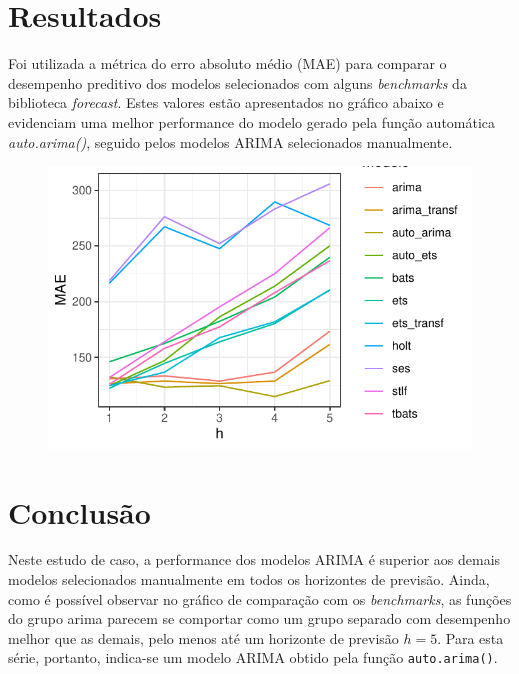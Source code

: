 \documentclass[
  letterpaper,
  DIV=11,
  numbers=noendperiod]{scrartcl}
\begin{document}
\newpage{}

\hypertarget{resultados}{%
\section{Resultados}\label{resultados}}

Foi utilizada a métrica do erro absoluto médio (MAE) para comparar o
desempenho preditivo dos modelos selecionados com alguns
\emph{benchmarks} da biblioteca \emph{forecast}. Estes valores estão
apresentados no gráfico abaixo e evidenciam uma melhor performance do
modelo gerado pela função automática \emph{auto.arima()}, seguido pelos
modelos ARIMA selecionados manualmente.

\begin{figure}

{\centering \includegraphics{T2_grupo5_files/figure-pdf/mae-grafico-1.pdf}

}

\end{figure}

\hypertarget{conclusuxe3o}{%
\section{Conclusão}\label{conclusuxe3o}}

Neste estudo de caso, a performance dos modelos ARIMA é superior aos
demais modelos selecionados manualmente em todos os horizontes de
previsão. Ainda, como é possível observar no gráfico de comparação com
os \emph{benchmarks}, as funções do grupo arima parecem se comportar
como um grupo separado com desempenho melhor que as demais, pelo menos
até um horizonte de previsão \(h=5\). Para esta série, portanto,
indica-se um modelo ARIMA obtido pela função \texttt{auto.arima()}.
\end{document}
